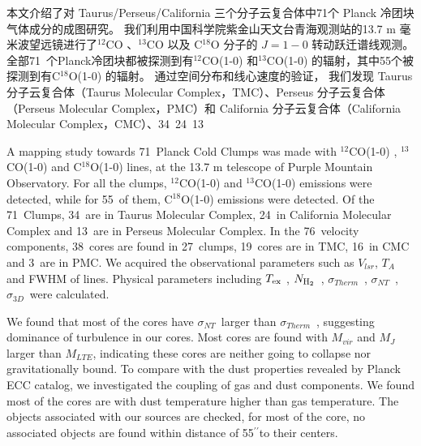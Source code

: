 \documentclass[UTF8, nocolorlinks]{pkuthss}
\newcommand{\coa}{$^{12}$CO }
\newcommand{\cob}{$^{13}$CO }
\newcommand{\coc}{C$^{18}$O }
\newcommand{\coaa}{$^{12}$CO(1-0) }
\newcommand{\cobb}{$^{13}$CO(1-0) }
\newcommand{\cocc}{C$^{18}$O(1-0) }
\newcommand{\texc}{$T_{\rm {ex}}$ }
\newcommand{\nhyd}{$N_{\rm H_2}$\ }
\newcommand{\sigmath}{$\sigma _{Therm}$\ }
\newcommand{\sigmant}{$\sigma _{NT}$\ }
\newcommand{\sigmatd}{$\sigma _{3D}$\ }
\newcommand{\arcsec}{$^{\prime\prime}$}
\newcommand{\numsou}{71\ }
\newcommand{\numsoutmc}{34\ }
\newcommand{\numsoupmc}{13\ }
\newcommand{\numsoucmc}{24\ }
\newcommand{\numcore}{38\ }
\newcommand{\numcoretmc}{19\ }
\newcommand{\numcorepmc}{3\ }
\newcommand{\numcorecmc}{16\ }
\newcommand{\numcocc}{55\ }
\newcommand{\numcompofcores}{27\ }
\newcommand{\numvelcomp}{76\ }
\begin{document}
	\frontmatter
	\maketitle

\begin{cabstract}

	本文介绍了对 Taurus/Perseus/California 三个分子云复合体中71个 Planck 冷团块气体成分的成图研究。 我们利用中国科学院紫金山天文台青海观测站的13.7 m 毫米波望远镜进行了\coa、\cob 以及 \coc 分子的 $J=1-0$ 转动跃迁谱线观测。全部\numsou 个Planck冷团块都被探测到有\coaa 和\cobb 的辐射，其中55个被探测到有\cocc 的辐射。 通过空间分布和线心速度的验证， 我们发现 Taurus 分子云复合体（Taurus Molecular Complex，TMC）、Perseus 分子云复合体（Perseus Molecular Complex，PMC）和 California 分子云复合体（California Molecular Complex，CMC）、\numsoutmc \numsoucmc \numsoupmc

\end{cabstract}

\begin{eabstract}

	A mapping study towards \numsou Planck Cold Clumps was made with \coaa, \cobb and \cocc lines, at the 13.7 m telescope of Purple Mountain Observatory. For all the clumps, \coaa and \cobb emissions were detected, while for \numcocc of them, \cocc emissions were detected.  Of the \numsou Clumps, \numsoutmc are in Taurus Molecular Complex, \numsoucmc in California  Molecular Complex and \numsoupmc are in Perseus Molecular Complex. In the \numvelcomp velocity components, \numcore cores are found in \numcompofcores clumps, \numcoretmc cores are in TMC, \numcorecmc in CMC and \numcorepmc are in PMC.
    We acquired the observational parameters such as $V_{lsr}$, $T_{A}$ and FWHM of lines. Physical parameters including \texc, \nhyd, \sigmath, \sigmant,  \sigmatd were calculated.

    We found that most of the cores have \sigmant larger than \sigmath, suggesting dominance of turbulence in our cores. Most cores are found with $M_{vir}$ and $M_J$ larger than $M_{LTE}$, indicating these cores are neither going to collapse nor gravitationally bound. To compare with the dust properties revealed by Planck ECC catalog, we investigated the coupling of gas and dust components. We found most of the cores are with dust temperature higher than gas temperature. The objects associated with our sources are checked, for most of the core, no associated objects are found within distance of 55\arcsec to their centers.

\end{eabstract}
\end{document}
